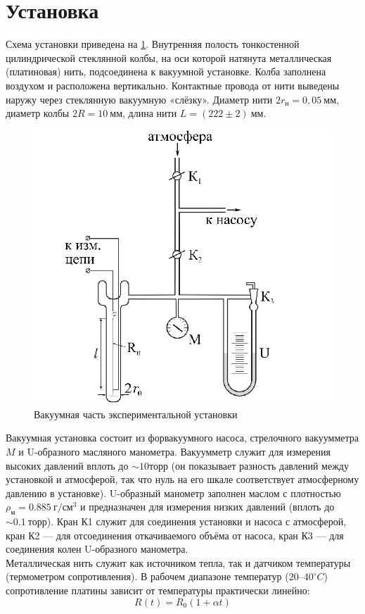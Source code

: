 \documentclass[12pt]{article}
\begin{document}
    \section{Установка}
        Схема установки приведена на \ref{vacuum_part}. Внутренняя полость тонкостенной
        цилиндрической стеклянной колбы, на оси которой натянута металлическая
        (платиновая) нить, подсоединена к вакуумной установке. Колба заполнена
        воздухом и расположена вертикально. Контактные провода от нити выведены
        наружу через стеклянную вакуумную «слёзку».
        Диаметр нити $2r_{\text{н}} = 0,05~\text{мм}$, диаметр колбы $2R = 10~\text{мм}$,
        длина нити $L = (222\pm 2)~\text{мм}$.
        \begin{figure}[H]
            \centering
            \includegraphics[width=0.4\linewidth]{vacuum.png}
            \caption{Вакуумная часть экспериментальной установки}
            \label{vacuum_part}
        \end{figure}
        Вакуумная установка состоит из форвакуумного насоса, стрелочного вакуумметра $M$ и U-образного масляного манометра. Вакуумметр служит для
        измерения высоких давлений вплоть до $\sim 10 \text{торр}$ (он показывает разность
        давлений между установкой и атмосферой, так что нуль на его шкале соответствует атмосферному давлению в установке). U-образный манометр
        заполнен маслом с плотностью $\rho_{\text{м}} = 0.885\ \text{г}/\text{см}^3$ и предназначен для измерения
        низких давлений (вплоть до $\sim 0.1\ \text{торр}$). Кран К1 служит для соединения установки и насоса с атмосферой, кран К2 — для отсоединения откачиваемого
        объёма от насоса, кран К3 — для соединения колен U-образного манометра.\\
        Металлическая нить служит как источником тепла, так и датчиком температуры
        (термометром сопротивления). В рабочем диапазоне температур ($20 – 40 ^{\circ} C$)
        сопротивление платины зависит от температуры практически линейно:
        \begin{equation}\label{sopr}
            R(t) = R_0(1+\alpha t)
        \end{equation}
\end{document}
